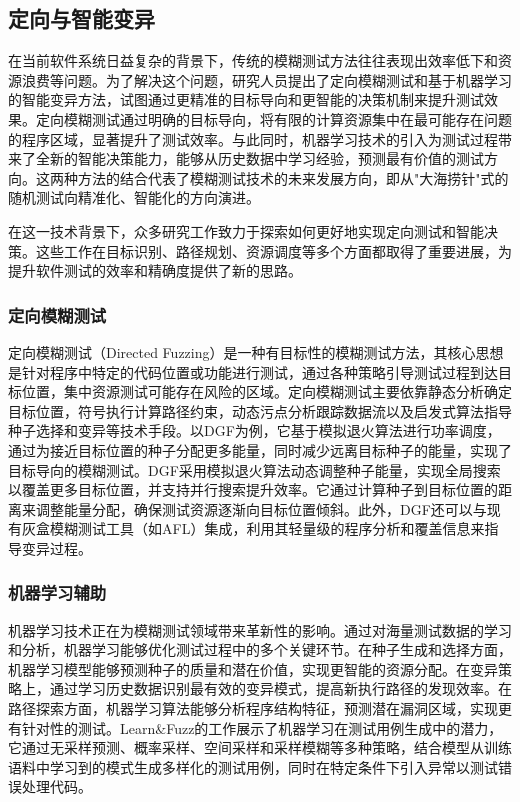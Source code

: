 \documentclass[10.5pt,compsoc]{CjC}
\theoremstyle{mystyle}
\begin{document}
\subsection{定向与智能变异}

在当前软件系统日益复杂的背景下，传统的模糊测试方法往往表现出效率低下和资源浪费等问题。为了解决这个问题，研究人员提出了定向模糊测试和基于机器学习的智能变异方法，试图通过更精准的目标导向和更智能的决策机制来提升测试效果。定向模糊测试通过明确的目标导向，将有限的计算资源集中在最可能存在问题的程序区域，显著提升了测试效率。与此同时，机器学习技术的引入为测试过程带来了全新的智能决策能力，能够从历史数据中学习经验，预测最有价值的测试方向。这两种方法的结合代表了模糊测试技术的未来发展方向，即从"大海捞针"式的随机测试向精准化、智能化的方向演进。

在这一技术背景下，众多研究工作致力于探索如何更好地实现定向测试和智能决策。这些工作在目标识别、路径规划、资源调度等多个方面都取得了重要进展，为提升软件测试的效率和精确度提供了新的思路。

\vspace {10mm}

\subsubsection{定向模糊测试}

定向模糊测试（Directed Fuzzing）是一种有目标性的模糊测试方法，其核心思想是针对程序中特定的代码位置或功能进行测试，通过各种策略引导测试过程到达目标位置，集中资源测试可能存在风险的区域。定向模糊测试主要依靠静态分析确定目标位置，符号执行计算路径约束，动态污点分析跟踪数据流以及启发式算法指导种子选择和变异等技术手段。以DGF为例，它基于模拟退火算法进行功率调度，通过为接近目标位置的种子分配更多能量，同时减少远离目标种子的能量，实现了目标导向的模糊测试。DGF采用模拟退火算法动态调整种子能量，实现全局搜索以覆盖更多目标位置，并支持并行搜索提升效率。它通过计算种子到目标位置的距离来调整能量分配，确保测试资源逐渐向目标位置倾斜。此外，DGF还可以与现有灰盒模糊测试工具（如AFL）集成，利用其轻量级的程序分析和覆盖信息来指导变异过程\cite{Böhme}。

\vspace {10mm}

\subsubsection{机器学习辅助}

机器学习技术正在为模糊测试领域带来革新性的影响。通过对海量测试数据的学习和分析，机器学习能够优化测试过程中的多个关键环节。在种子生成和选择方面，机器学习模型能够预测种子的质量和潜在价值，实现更智能的资源分配。在变异策略上，通过学习历史数据识别最有效的变异模式，提高新执行路径的发现效率。在路径探索方面，机器学习算法能够分析程序结构特征，预测潜在漏洞区域，实现更有针对性的测试。Learn$\&$Fuzz的工作展示了机器学习在测试用例生成中的潜力，它通过无采样预测、概率采样、空间采样和采样模糊等多种策略\cite{Godefroid}，结合模型从训练语料中学习到的模式生成多样化的测试用例，同时在特定条件下引入异常以测试错误处理代码。
\end{document}
